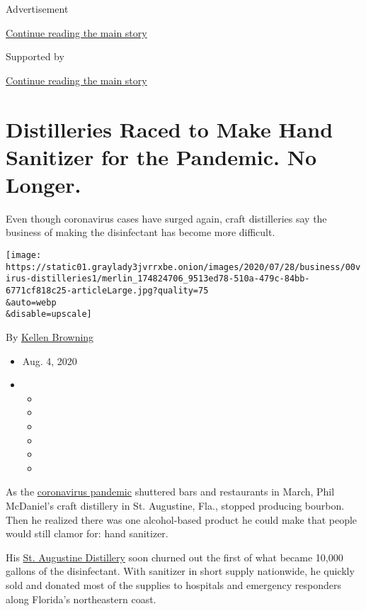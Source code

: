 Advertisement

\protect\hyperlink{after-top}{Continue reading the main story}

Supported by

\protect\hyperlink{after-sponsor}{Continue reading the main story}

\hypertarget{distilleries-raced-to-make-hand-sanitizer-for-the-pandemic-no-longer}{%
\section{Distilleries Raced to Make Hand Sanitizer for the Pandemic. No
Longer.}\label{distilleries-raced-to-make-hand-sanitizer-for-the-pandemic-no-longer}}

Even though coronavirus cases have surged again, craft distilleries say
the business of making the disinfectant has become more difficult.

\texttt{[image: https://static01.graylady3jvrrxbe.onion/images/2020/07/28/business/00virus-distilleries1/merlin\_174824706\_9513ed78-510a-479c-84bb-6771cf818c25-articleLarge.jpg?quality=75\\\&auto=webp\\\&disable=upscale]}

By \href{https://www.nytimes3xbfgragh.onion/by/kellen-browning}{Kellen
Browning}

\begin{itemize}
\item
  Aug. 4, 2020
\item
  \begin{itemize}
  \item
  \item
  \item
  \item
  \item
  \item
  \end{itemize}
\end{itemize}

As the
\href{https://www.nytimes3xbfgragh.onion/news-event/coronavirus?action=click\&pgtype=Article\&state=default\&module=styln-coronavirus\&region=TOP_BANNER\&context=storylines_menu}{coronavirus
pandemic} shuttered bars and restaurants in March, Phil McDaniel's craft
distillery in St. Augustine, Fla., stopped producing bourbon. Then he
realized there was one alcohol-based product he could make that people
would still clamor for: hand sanitizer.

His \href{http://staugustinedistillery.com/}{St. Augustine Distillery}
soon churned out the first of what became 10,000 gallons of the
disinfectant. With sanitizer in short supply nationwide, he quickly sold
and donated most of the supplies to hospitals and emergency responders
along Florida's northeastern coast.

